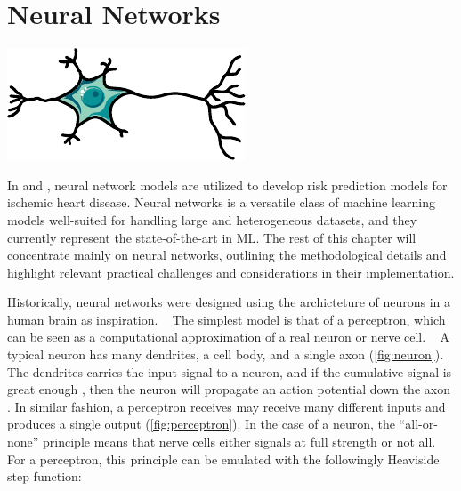 \clearpage
\section{Neural Networks}

\begin{marginfigure}[3em]
	\includegraphics[width=\linewidth]{graphics/neuron}
    \caption[Schematic diagram of a neuron]{%
        Schematic diagram of a neuron.
        A typical neuron has a dendrites, a cell body, and a single axon; 
        the dendrites receive input signals from other neurons,
        and propagates output signals along the axon.
    }
    \label{fig:neuron}
\end{marginfigure}%

In  and , 
neural network models are utilized to 
develop risk prediction models for ischemic heart disease.
Neural networks is a versatile class of machine learning models
well-suited for handling large and heterogeneous datasets, 
and they currently represent the state-of-the-art in \ac{ML}.
The rest of this chapter will concentrate mainly on neural networks, 
outlining the methodological details and highlight 
relevant practical challenges and considerations 
in their implementation.

Historically, neural networks were designed
using the archicteture of neurons in a human brain as inspiration.
~\autocite{goodfellow2016deep}
The simplest model is that of a perceptron, 
which can be seen as a computational approximation
of a real neuron or nerve cell.
~\autocite{charniakIntroduction2019}
A typical neuron has many dendrites, a cell body, and a single axon 
(\cref{fig:neuron}).
The dendrites carries the input signal to a neuron,
and if the cumulative signal is great enough%
, 
then the neuron will propagate an action potential down the axon%
\autocite{seifterConcepts2005}.
In similar fashion, a perceptron receives may receive many different inputs
and produces a single output (\cref{fig:perceptron}).
In the case of a neuron, the \enquote{all-or-none} principle means
that nerve cells either signals at full strength or not all.
For a perceptron, this principle can be emulated
with the followingly Heaviside step function:
~\autocite{charniakIntroduction2019}

